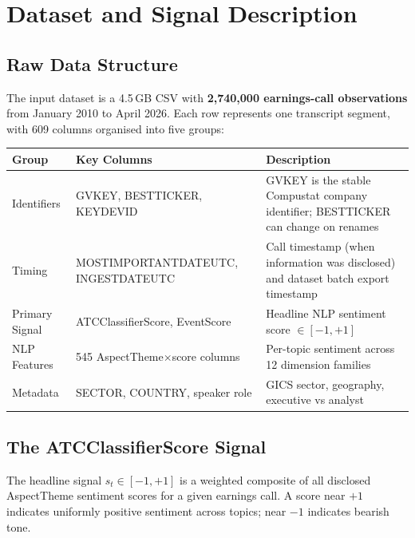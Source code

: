 \documentclass[11pt,a4paper]{article}
\begin{document}
\tableofcontents
\newpage

\section{Dataset and Signal Description}

\subsection{Raw Data Structure}

The input dataset is a 4.5\,GB CSV with \textbf{2,740,000 earnings-call observations} from January 2010 to April 2026. Each row represents one transcript segment, with 609 columns organised into five groups:

\begin{center}
\begin{tabular}{llp{8cm}}
\toprule
\textbf{Group} & \textbf{Key Columns} & \textbf{Description}\\
\midrule
Identifiers & GVKEY, BESTTICKER, KEYDEVID & GVKEY is the stable Compustat company identifier; BESTTICKER can change on renames\\
Timing & MOSTIMPORTANTDATEUTC, INGESTDATEUTC & Call timestamp (when information was disclosed) and dataset batch export timestamp\\
Primary Signal & ATCClassifierScore, EventScore & Headline NLP sentiment score $\in[-1,+1]$\\
NLP Features & 545 AspectTheme$\times$score columns & Per-topic sentiment across 12 dimension families\\
Metadata & SECTOR, COUNTRY, speaker role & GICS sector, geography, executive vs analyst\\
\bottomrule
\end{tabular}
\end{center}

\subsection{The ATCClassifierScore Signal}

The headline signal $s_t \in [-1, +1]$ is a weighted composite of all disclosed AspectTheme sentiment scores for a given earnings call. A score near $+1$ indicates uniformly positive sentiment across topics; near $-1$ indicates bearish tone.
\end{document}
